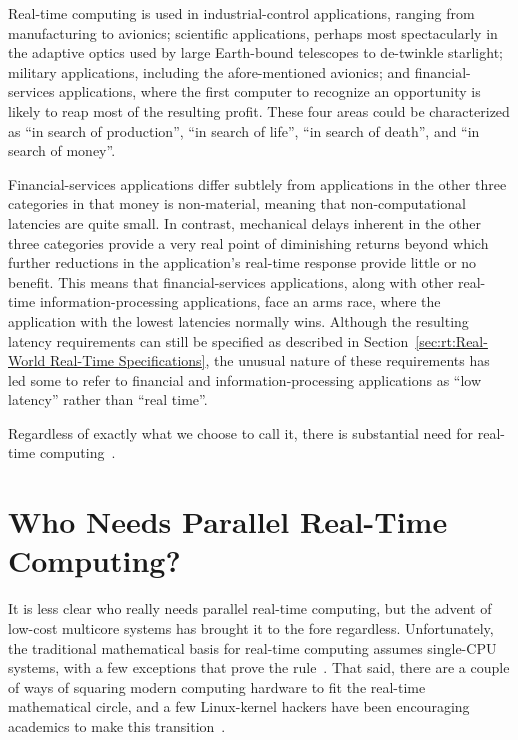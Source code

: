 Real-time computing is used in industrial-control applications, ranging from
manufacturing to avionics;
scientific applications, perhaps most spectacularly in the adaptive
optics used by
large Earth-bound telescopes to de-twinkle starlight;
military applications, including the afore-mentioned avionics;
and financial-services applications, where the first computer to recognize
an opportunity is likely to reap most of the resulting profit.
These four areas could be characterized as ``in search of production'',
``in search of life'', ``in search of death'', and ``in search of money''.

Financial-services applications differ subtlely from applications in
the other three categories in that money is non-material, meaning that
non-computational latencies are quite small.
In contrast, mechanical delays inherent in the other three categories
provide a very real point of diminishing returns beyond which further
reductions in the application's real-time response provide little or
no benefit.
This means that financial-services applications, along with other
real-time information-processing applications, face an arms race,
where the application with the lowest latencies normally wins.
Although the resulting latency requirements can still be specified
as described in
Section~\ref{sec:rt:Real-World Real-Time Specifications},
the unusual nature of these requirements has led some to refer to
financial and information-processing applications as ``low latency''
rather than ``real time''.

Regardless of exactly what we choose to call it, there is substantial
need for real-time
computing~\cite{JeremyWPeters2006NYTDec11,BillInmon2007a}.

\section{Who Needs Parallel Real-Time Computing?}
\label{sec:rt:Who Needs Parallel Real-Time Computing?}

It is less clear who really needs parallel real-time computing, but
the advent of low-cost multicore systems has brought it to the fore
regardless.
Unfortunately, the traditional mathematical basis for real-time
computing assumes single-CPU systems, with a few exceptions that
prove the rule~\cite{BjoernBrandenburgPhD}.
That said, there are a couple of ways of squaring modern computing
hardware to fit the real-time mathematical circle, and a few Linux-kernel
hackers have been encouraging academics to make this
transition~\cite{ThomasGleixner2010AcademiaVsReality}.

